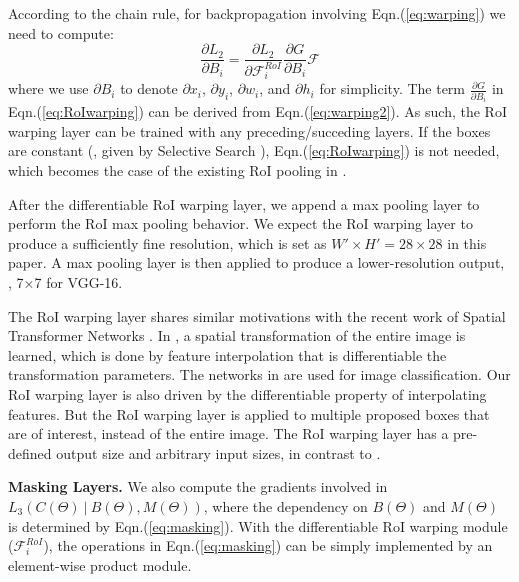 \documentclass[10pt,twocolumn,letterpaper]{article}
\begin{document}
According to the chain rule, for backpropagation involving Eqn.(\ref{eq:warping}) we need to compute:
\begin{equation}
\frac{\partial{L_2}}{\partial{B_i}} = %
\frac{\partial{L_2}}{\partial{\mathcal{F}^{RoI}_i}} \frac{\partial{G}}{\partial{B_i}}\mathcal{F}
\label{eq:RoIwarping}
\end{equation}
where we use ${\partial{B_i}}$ to denote ${\partial{x_i}}$, ${\partial{y_i}}$, ${\partial{w_i}}$, and ${\partial{h_i}}$ for simplicity. The term $\frac{\partial{G}}{\partial{B_i}}$ in Eqn.(\ref{eq:RoIwarping}) can be derived from Eqn.(\ref{eq:warping2}). As such, the RoI warping layer can be trained with any preceding/succeding layers. If the boxes are constant (\eg, given by Selective Search \cite{Uijlings2013}), Eqn.(\ref{eq:RoIwarping}) is not needed, which becomes the case of the existing RoI pooling in \cite{Girshick2015}.

After the differentiable RoI warping layer, we append a max pooling layer to perform the RoI max pooling behavior. We expect the RoI warping layer to produce a sufficiently fine resolution, which is set as $W'\times H'=28\times28$ in this paper. A max pooling layer is then applied to produce a lower-resolution output, \eg, 7$\times$7 for VGG-16.

The RoI warping layer shares similar motivations with the recent work of Spatial Transformer Networks \cite{Jaderberg2015}. In \cite{Jaderberg2015}, a spatial transformation of the entire image is learned, which is done by feature interpolation that is differentiable \wrt the transformation parameters. The networks in \cite{Jaderberg2015} are used for image classification. Our RoI warping layer is also driven by the differentiable property of interpolating features.
But the RoI warping layer is applied to multiple proposed boxes that are of interest, instead of the entire image. The RoI warping layer has a pre-defined output size and arbitrary input sizes, in contrast to \cite{Jaderberg2015}.


\vspace{.5em}
\noindent\textbf{Masking Layers.}
We also compute the gradients involved in $L_3(C(\Theta)~|~B(\Theta), M(\Theta))$, where the dependency on $B(\Theta)$ and $M(\Theta)$ is determined by Eqn.(\ref{eq:masking}).
With the differentiable RoI warping module ($\mathcal{F}^{RoI}_i$), the operations in Eqn.(\ref{eq:masking}) can be simply implemented by an element-wise product module.
\end{document}

